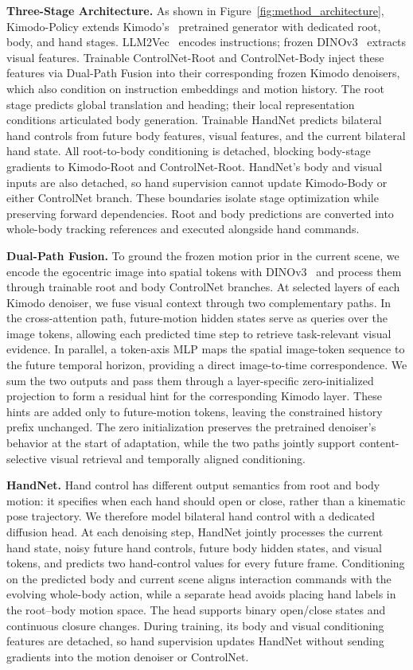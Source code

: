 \textbf{Three-Stage Architecture.}
As shown in Figure~\ref{fig:method_architecture}, Kimodo-Policy extends Kimodo's~\cite{kimodo} pretrained generator with dedicated root, body, and hand stages. LLM2Vec~\cite{behnamghader2024llm2veclargelanguagemodels} encodes instructions; frozen DINOv3~\cite{dinov3} extracts visual features. Trainable ControlNet-Root and ControlNet-Body inject these features via Dual-Path Fusion into their corresponding frozen Kimodo denoisers, which also condition on instruction embeddings and motion history. The root stage predicts global translation and heading; their local representation conditions articulated body generation. Trainable HandNet predicts bilateral hand controls from future body features, visual features, and the current bilateral hand state. All root-to-body conditioning is detached, blocking body-stage gradients to Kimodo-Root and ControlNet-Root. HandNet's body and visual inputs are also detached, so hand supervision cannot update Kimodo-Body or either ControlNet branch. These boundaries isolate stage optimization while preserving forward dependencies. Root and body predictions are converted into whole-body tracking references and executed alongside hand commands.

\textbf{Dual-Path Fusion.} To ground the frozen motion prior in the current scene, we encode the egocentric image into spatial tokens with DINOv3~\cite{dinov3} and process them through trainable root and body ControlNet branches. At selected layers of each Kimodo denoiser, we fuse visual context through two complementary paths. In the cross-attention path, future-motion hidden states serve as queries over the image tokens, allowing each predicted time step to retrieve task-relevant visual evidence. In parallel, a token-axis MLP maps the spatial image-token sequence to the future temporal horizon, providing a direct image-to-time correspondence. We sum the two outputs and pass them through a layer-specific zero-initialized projection to form a residual hint for the corresponding Kimodo layer. These hints are added only to future-motion tokens, leaving the constrained history prefix unchanged. The zero initialization preserves the pretrained denoiser's behavior at the start of adaptation, while the two paths jointly support content-selective visual retrieval and temporally aligned conditioning.

\textbf{HandNet.} Hand control has different output semantics from root and body motion: it specifies when each hand should open or close, rather than a kinematic pose trajectory. We therefore model bilateral hand control with a dedicated diffusion head. At each denoising step, HandNet jointly processes the current hand state, noisy future hand controls, future body hidden states, and visual tokens, and predicts two hand-control values for every future frame. Conditioning on the predicted body and current scene aligns interaction commands with the evolving whole-body action, while a separate head avoids placing hand labels in the root--body motion space. The head supports binary open/close states and continuous closure changes. During training, its body and visual conditioning features are detached, so hand supervision updates HandNet without sending gradients into the motion denoiser or ControlNet.

